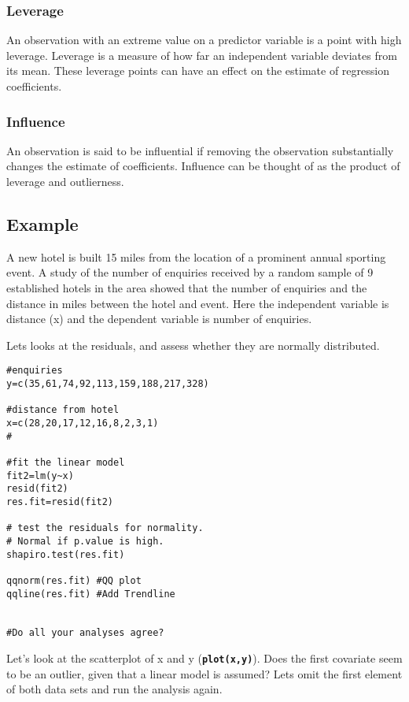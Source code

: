 \subsubsection{Leverage}  An observation with an extreme value on a predictor variable is a point with high leverage.  Leverage is a measure of how far an independent variable deviates from its mean.  These leverage points can have an effect on the estimate of regression coefficients.

\subsubsection{Influence} An observation is said to be influential if removing the observation substantially changes the estimate of coefficients.  Influence can be thought of as the product of leverage and outlierness.
\subsection{Example}
A new hotel is built 15 miles from the location of a prominent annual sporting event. A study of the number of enquiries received by a random sample of 9 established hotels in the area showed that the number of enquiries and the distance in miles between the hotel and event. Here the independent variable is distance (x) and the dependent variable is number of enquiries.

Lets looks at the residuals, and assess whether they are normally distributed.

\begin{framed}
\begin{verbatim}
#enquiries
y=c(35,61,74,92,113,159,188,217,328)
 	
#distance from hotel
x=c(28,20,17,12,16,8,2,3,1)	
#

#fit the linear model	
fit2=lm(y~x)					
resid(fit2)
res.fit=resid(fit2)

# test the residuals for normality.
# Normal if p.value is high.
shapiro.test(res.fit)	
	
qqnorm(res.fit)	#QQ plot
qqline(res.fit)	#Add Trendline


#Do all your analyses agree?

\end{verbatim}
\end{framed}
Let’s look at the scatterplot of x and y (\textbf{\texttt{plot(x,y)}}).  Does the first covariate seem to be an outlier, given that a linear model is assumed?
Lets omit the first element of both data sets and run the analysis again.

